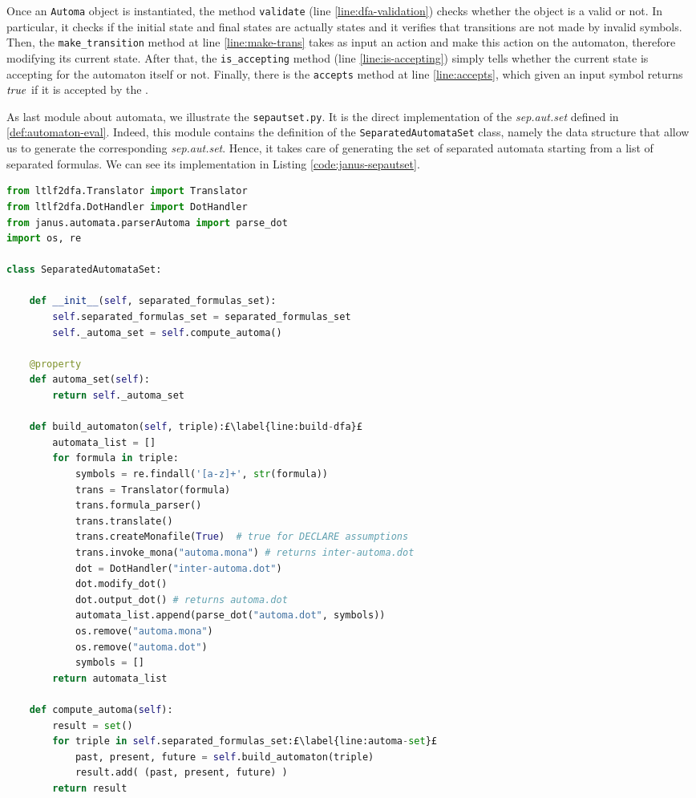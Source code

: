 Once an \texttt{Automa} object is instantiated, the method \texttt{validate} (line \ref{line:dfa-validation}) checks whether the object is a valid \DFA or not. In particular, it checks if the initial state and final states are actually states and it verifies that transitions are not made by invalid symbols.
Then, the \texttt{make\_transition} method at line \ref{line:make-trans} takes as input an action and make this action on the automaton, therefore modifying its current state. After that, the \texttt{is\_accepting} method (line \ref{line:is-accepting}) simply tells whether the current state is accepting for the automaton itself or not. Finally, there is the \texttt{accepts} method at line \ref{line:accepts}, which given an input symbol returns $\mathit{true}$ if it is accepted by the \DFA.

As last module about automata, we illustrate the \texttt{sepautset.py}. It is the direct implementation of the \textit{sep.aut.set} defined in \ref{def:automaton-eval}. Indeed, this module contains the definition of the \texttt{SeparatedAutomataSet} class, namely the data structure that allow us to generate the corresponding \textit{sep.aut.set}. Hence, it takes care of generating the set of separated automata starting from a list of separated formulas. We can see its implementation in Listing \ref{code:janus-sepautset}.
\begin{lstlisting}[language=Python, style=Python, escapechar = £, label={code:janus-sepautset}, caption={The \texttt{sepautset.py} module}]
from ltlf2dfa.Translator import Translator
from ltlf2dfa.DotHandler import DotHandler
from janus.automata.parserAutoma import parse_dot
import os, re

class SeparatedAutomataSet:

    def __init__(self, separated_formulas_set):
        self.separated_formulas_set = separated_formulas_set
        self._automa_set = self.compute_automa()

    @property
    def automa_set(self):
        return self._automa_set

    def build_automaton(self, triple):£\label{line:build-dfa}£
        automata_list = []
        for formula in triple:
            symbols = re.findall('[a-z]+', str(formula))
            trans = Translator(formula)
            trans.formula_parser()
            trans.translate()
            trans.createMonafile(True)  # true for DECLARE assumptions
            trans.invoke_mona("automa.mona") # returns inter-automa.dot
            dot = DotHandler("inter-automa.dot")
            dot.modify_dot()
            dot.output_dot() # returns automa.dot
            automata_list.append(parse_dot("automa.dot", symbols))
            os.remove("automa.mona")
            os.remove("automa.dot")
            symbols = []
        return automata_list

    def compute_automa(self):
        result = set()
        for triple in self.separated_formulas_set:£\label{line:automa-set}£
            past, present, future = self.build_automaton(triple)
            result.add( (past, present, future) )
        return result
\end{lstlisting}

